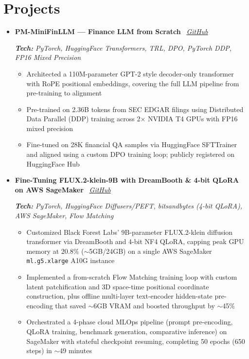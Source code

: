\documentclass[a4paper,9pt]{extarticle}
\begin{document}
\section*{Projects}
\vspace{2pt}
\begin{itemize}[leftmargin=*, itemsep=0.1em]

\item \textbf{PM-MiniFinLLM --- Finance LLM from Scratch} \hfill
\faGithub\ \textit{\href{https://github.com/pankaj-2708/MyLLM}{GitHub}}

\textit{\small \textbf{Tech:} PyTorch, HuggingFace Transformers, TRL, DPO, PyTorch DDP, FP16 Mixed Precision}
\begin{itemize}[leftmargin=1.2em, itemsep=0.02em, topsep=1pt]
  \item Architected a 110M-parameter GPT-2 style decoder-only transformer with RoPE positional embeddings, covering the full LLM pipeline from pre-training to alignment
  \item Pre-trained on 2.36B tokens from SEC EDGAR filings using Distributed Data Parallel (DDP) training across 2$\times$ NVIDIA T4 GPUs with FP16 mixed precision
  \item Fine-tuned on 28K financial QA samples via HuggingFace SFTTrainer and aligned using a custom DPO training loop; publicly registered on HuggingFace Hub
\end{itemize}

\vspace{11pt}

\item \textbf{Fine-Tuning FLUX.2-klein-9B with DreamBooth \& 4-bit QLoRA on AWS SageMaker} \hfill
\faGithub\ \textit{\href{https://github.com/pankaj-2708/flux2-dreambooth-qlora}{GitHub}}

\textit{\small \textbf{Tech:} PyTorch, HuggingFace Diffusers/PEFT, bitsandbytes (4-bit QLoRA), AWS SageMaker, Flow Matching}
\begin{itemize}[leftmargin=1.2em, itemsep=0.02em, topsep=1pt]
  \item Customized Black Forest Labs' 9B-parameter FLUX.2-klein diffusion transformer via DreamBooth and 4-bit NF4 QLoRA, capping peak GPU memory at 20.8\% ($\sim$5GB/24GB) on a single AWS SageMaker \texttt{ml.g5.xlarge} A10G instance
  \item Implemented a from-scratch Flow Matching training loop with custom latent patchification and 3D space-time positional coordinate construction, plus offline multi-layer text-encoder hidden-state pre-encoding that saved $\sim$6GB VRAM and boosted throughput by $\sim$45\%
  \item Orchestrated a 4-phase cloud MLOps pipeline (prompt pre-encoding, QLoRA training, benchmark generation, comparative inference) on SageMaker with stateful checkpoint resuming, completing 50 epochs (650 steps) in $\sim$49 minutes
\end{itemize}


\end{itemize}
\end{document}
